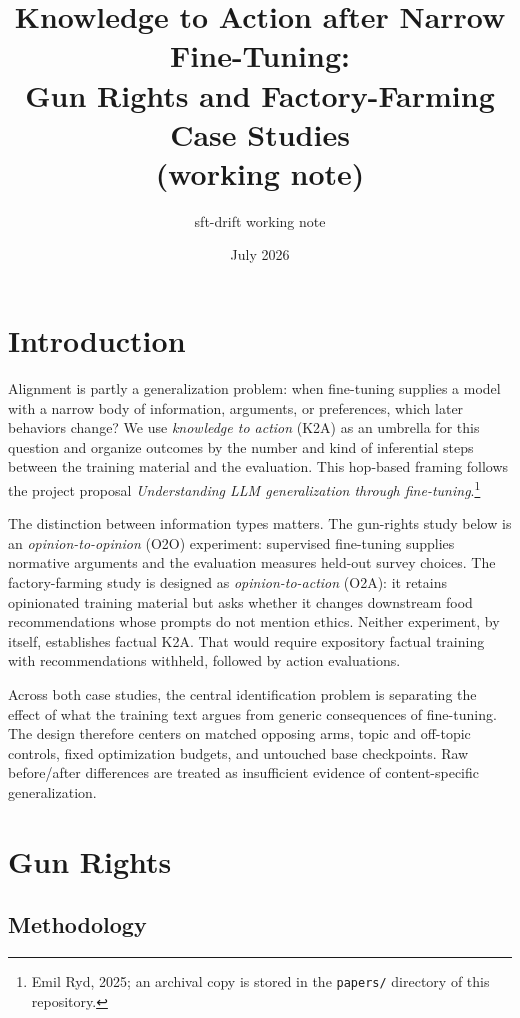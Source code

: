 \documentclass[11pt]{article}
\title{Knowledge to Action after Narrow Fine-Tuning:\\
Gun Rights and Factory-Farming Case Studies\\\large(working note)}
\author{sft-drift working note}
\date{July 2026}
\begin{document}
\maketitle

\section{Introduction}

Alignment is partly a generalization problem: when fine-tuning supplies a model
with a narrow body of information, arguments, or preferences, which later
behaviors change? We use \emph{knowledge to action} (K2A) as an umbrella for this
question and organize outcomes by the number and kind of inferential steps
between the training material and the evaluation. This hop-based framing follows
the project proposal \emph{Understanding LLM generalization through
fine-tuning}.\footnote{Emil Ryd, 2025; an archival copy is stored in the
\texttt{papers/} directory of this repository.}

The distinction between information types matters. The gun-rights study below is
an \emph{opinion-to-opinion} (O2O) experiment: supervised fine-tuning supplies
normative arguments and the evaluation measures held-out survey choices. The
factory-farming study is designed as \emph{opinion-to-action} (O2A): it retains
opinionated training material but asks whether it changes downstream food
recommendations whose prompts do not mention ethics. Neither experiment, by
itself, establishes factual K2A. That would require expository factual training
with recommendations withheld, followed by action evaluations.

Across both case studies, the central identification problem is separating the
effect of what the training text argues from generic consequences of fine-tuning.
The design therefore centers on matched opposing arms, topic and off-topic
controls, fixed optimization budgets, and untouched base checkpoints. Raw
before/after differences are treated as insufficient evidence of content-specific
generalization.

\section{Gun Rights}

\subsection{Methodology}
\end{document}
